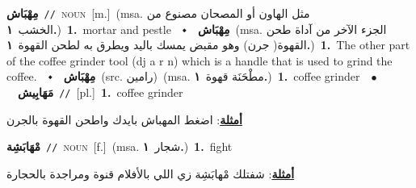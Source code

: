 \documentclass[10pt,a4paper,twoside]{article} %
\begin{document}
\begin{multicols}{2}
{{{{\setlength\topsep{0pt}\textbf{\foreignlanguage{arabic}{مِهْبَاش}}\ {\color{gray}\texttt{//}\color{black}}\ \textsc{noun}\ [m.]\ \color{gray}(msa. \foreignlanguage{arabic}{مثل الهاون أو المصحان مصنوع من الخشب}~\foreignlanguage{arabic}{\textbf{١.}})\color{black}\ \textbf{1.}~mortar and pestle\ \ $\smblkdiamond$\ \ \setlength\topsep{0pt}\textbf{\foreignlanguage{arabic}{مِهْبَاش}}\ \color{gray}(msa. \foreignlanguage{arabic}{الجزء الآخر من آداة طحن القهوة( جرن) وهو مقبض يمسك باليد ويطرق به لطحن القهوة}~\foreignlanguage{arabic}{\textbf{١.}})\color{black}\ \textbf{1.}~The other part of the coffee grinder tool (dj a r n) which is a handle that is used to grind the coffee.\ \ $\smblkdiamond$\ \ \setlength\topsep{0pt}\textbf{\foreignlanguage{arabic}{مِهْبَاش}}\ (src. \color{gray}\foreignlanguage{arabic}{رامين}\color{black})\ \color{gray}(msa. \foreignlanguage{arabic}{مطْحَنَة قهوة}~\foreignlanguage{arabic}{\textbf{١.}})\color{black}\ \textbf{1.}~coffee grinder\ \ $\bullet$\ \ \setlength\topsep{0pt}\textbf{\foreignlanguage{arabic}{مَهَابِيش}}\ {\color{gray}\texttt{//}\color{black}}\ [pl.]\ \textbf{1.}~coffee grinder\  \begin{flushright}\color{gray}\foreignlanguage{arabic}{\textbf{\underline{\foreignlanguage{arabic}{أمثلة}}}: اضغط المهباش بايدك واطحن القهوة بالجرن}\end{flushright}\color{black}} \vspace{2mm}

{\setlength\topsep{0pt}\textbf{\foreignlanguage{arabic}{مْهَابَشِة}}\ {\color{gray}\texttt{//}\color{black}}\ \textsc{noun}\ [f.]\ \color{gray}(msa. \foreignlanguage{arabic}{شجار}~\foreignlanguage{arabic}{\textbf{١.}})\color{black}\ \textbf{1.}~fight\  \begin{flushright}\color{gray}\foreignlanguage{arabic}{\textbf{\underline{\foreignlanguage{arabic}{أمثلة}}}: شفتلك مْهابَشِة زي اللي بالأفلام قنوة ومراجدة بالحجارة}\end{flushright}\color{black}} \vspace{2mm}

}}}
\end{multicols}
\end{document}
